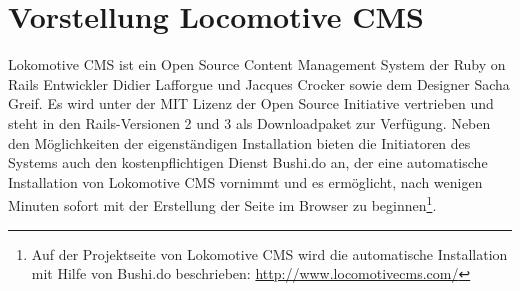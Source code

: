 \section{Vorstellung Locomotive CMS}
Lokomotive CMS ist ein Open Source Content Management System der Ruby on Rails Entwickler Didier Lafforgue und Jacques Crocker sowie dem Designer Sacha Greif. Es wird unter der MIT Lizenz der Open Source Initiative vertrieben und steht in den Rails-Versionen 2 und 3 als Downloadpaket zur Verfügung. Neben den Möglichkeiten der eigenständigen Installation bieten die Initiatoren des Systems auch den kostenpflichtigen Dienst Bushi.do an, der eine automatische Installation von Lokomotive CMS vornimmt und es ermöglicht, nach wenigen Minuten sofort mit der Erstellung der Seite im Browser zu beginnen\footnote{Auf der Projektseite von Lokomotive CMS wird die automatische Installation mit Hilfe von Bushi.do beschrieben: \href{http://www.locomotivecms.com/}{http://www.locomotivecms.com/}}.
